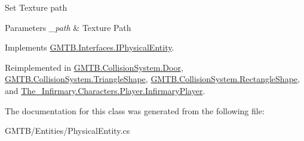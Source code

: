 Set Texture path 


\begin{DoxyParams}{Parameters}
{\em \+\_\+path} & Texture Path\\
\hline
\end{DoxyParams}


Implements \mbox{\hyperlink{interface_g_m_t_b_1_1_interfaces_1_1_i_physical_entity}{G\+M\+T\+B.\+Interfaces.\+I\+Physical\+Entity}}.



Reimplemented in \mbox{\hyperlink{class_g_m_t_b_1_1_collision_system_1_1_door_a45583194dab8dc4b35266644b94d3c40}{G\+M\+T\+B.\+Collision\+System.\+Door}}, \mbox{\hyperlink{class_g_m_t_b_1_1_collision_system_1_1_triangle_shape_a4389017110af14cca74a2a26475eccd6}{G\+M\+T\+B.\+Collision\+System.\+Triangle\+Shape}}, \mbox{\hyperlink{class_g_m_t_b_1_1_collision_system_1_1_rectangle_shape_aeb763e34b0be4dff6f0e67fb623bb246}{G\+M\+T\+B.\+Collision\+System.\+Rectangle\+Shape}}, and \mbox{\hyperlink{class_the___infirmary_1_1_characters_1_1_player_1_1_infirmary_player_a0833a307f7cb4ef7f1dd99f10e8db6e9}{The\+\_\+\+Infirmary.\+Characters.\+Player.\+Infirmary\+Player}}.



The documentation for this class was generated from the following file\+:\begin{DoxyCompactItemize}
\item 
G\+M\+T\+B/\+Entities/Physical\+Entity.\+cs\end{DoxyCompactItemize}
